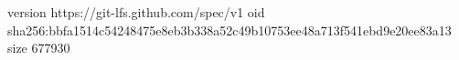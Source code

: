 version https://git-lfs.github.com/spec/v1
oid sha256:bbfa1514c54248475e8eb3b338a52c49b10753ee48a713f541ebd9e20ee83a13
size 677930
